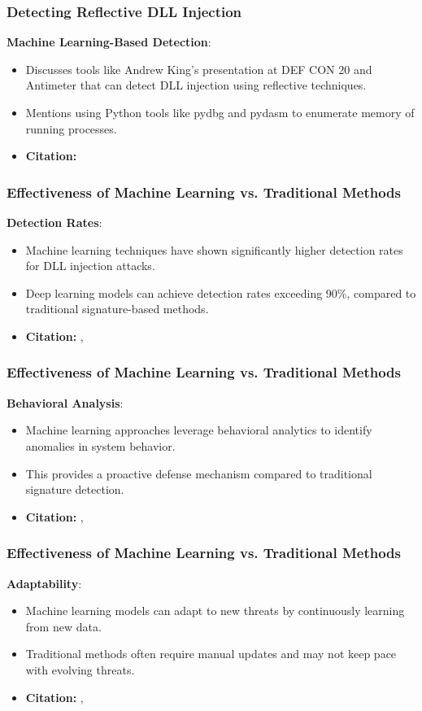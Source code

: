 \begin{frame}
    \frametitle{Detecting Reflective DLL Injection}
    \textbf{Machine Learning-Based Detection}:
    \begin{itemize}
        \item Discusses tools like Andrew King's presentation at DEF CON 20 and Antimeter that can detect DLL injection using reflective techniques.
        \item Mentions using Python tools like pydbg and pydasm to enumerate memory of running processes.
        \item \textbf{Citation:} \cite{stackoverflow2012}
    \end{itemize}
\end{frame}

\begin{frame}
    \frametitle{Effectiveness of Machine Learning vs. Traditional Methods}
    \textbf{Detection Rates}:
    \begin{itemize}
        \item Machine learning techniques have shown significantly higher detection rates for DLL injection attacks.
        \item Deep learning models can achieve detection rates exceeding 90\%, compared to traditional signature-based methods.
        \item \textbf{Citation:} \cite{kim2023}, \cite{stackoverflow2012}
    \end{itemize}
\end{frame}

\begin{frame}
    \frametitle{Effectiveness of Machine Learning vs. Traditional Methods}
    \textbf{Behavioral Analysis}:
    \begin{itemize}
        \item Machine learning approaches leverage behavioral analytics to identify anomalies in system behavior.
        \item This provides a proactive defense mechanism compared to traditional signature detection.
        \item \textbf{Citation:} \cite{aljabri2024}, \cite{stackoverflow2012}
    \end{itemize}
\end{frame}

\begin{frame}
    \frametitle{Effectiveness of Machine Learning vs. Traditional Methods}
    \textbf{Adaptability}:
    \begin{itemize}
        \item Machine learning models can adapt to new threats by continuously learning from new data.
        \item Traditional methods often require manual updates and may not keep pace with evolving threats.
        \item \textbf{Citation:} \cite{reasonlabs2023}, \cite{aljabri2024}
    \end{itemize}
\end{frame}

